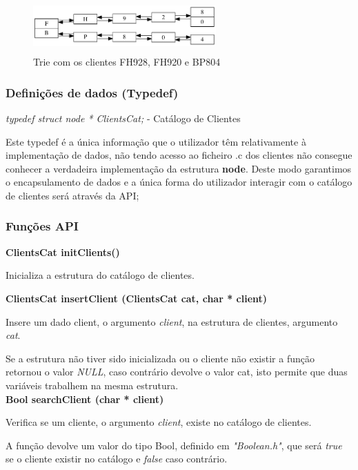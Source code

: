 \documentclass[10pt] {article}
\begin{document}
\begin{figure}[ht!]
\centering
\includegraphics[width=70mm, height=20mm]{trie.png}
\caption{Trie com os clientes FH928, FH920 e BP804}
\end{figure}

\subsubsection{Definições de dados (Typedef)}
\emph{typedef struct node * ClientsCat;} - Catálogo de Clientes
\par Este typedef é a única informação que o utilizador têm relativamente à implementação de dados, não tendo 
acesso ao ficheiro .c dos clientes não consegue conhecer a verdadeira implementação da estrutura \textbf{node}. 
Deste modo garantimos o encapsulamento de dados e a única forma do utilizador interagir com o catálogo de 
clientes será através da API;

\subsubsection{Funções API}

\noindent\textbf{ClientsCat initClients()}
\par Inicializa a estrutura do catálogo de clientes.

\noindent\textbf{ClientsCat insertClient (ClientsCat cat, char * client)}
\par Insere um dado client, o argumento \emph{client}, na estrutura de clientes, argumento \emph{cat}.
\par Se a estrutura não tiver sido inicializada ou o cliente não existir a função retornou o valor \emph{NULL},
caso contrário devolve o valor cat, isto permite que duas variáveis trabalhem na mesma estrutura. \\

\noindent \textbf {Bool searchClient (char * client)}
\par Verifica se um cliente, o argumento \emph{client}, existe no catálogo de clientes.
\par A função devolve um valor do tipo Bool, definido em \emph{"Boolean.h"}, que será \emph{true} se o
cliente existir no catálogo e \emph{false} caso contrário. \\
\end{document}
